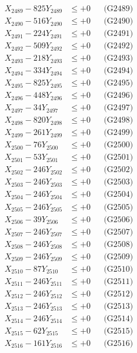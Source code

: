 \documentclass[a4paper,10pt]{article}
\begin{document}
{\begin{align}
X_{2489} - 825Y_{2489} &\leq +0 && \text{(G2489)} \\
X_{2490} - 516Y_{2490} &\leq +0 && \text{(G2490)} \\
\allowbreak
X_{2491} - 224Y_{2491} &\leq +0 && \text{(G2491)} \\
X_{2492} - 509Y_{2492} &\leq +0 && \text{(G2492)} \\
X_{2493} - 218Y_{2493} &\leq +0 && \text{(G2493)} \\
X_{2494} - 334Y_{2494} &\leq +0 && \text{(G2494)} \\
X_{2495} - 825Y_{2495} &\leq +0 && \text{(G2495)} \\
X_{2496} - 448Y_{2496} &\leq +0 && \text{(G2496)} \\
X_{2497} - 34Y_{2497} &\leq +0 && \text{(G2497)} \\
X_{2498} - 820Y_{2498} &\leq +0 && \text{(G2498)} \\
X_{2499} - 261Y_{2499} &\leq +0 && \text{(G2499)} \\
X_{2500} - 76Y_{2500} &\leq +0 && \text{(G2500)} \\
\allowbreak
X_{2501} - 53Y_{2501} &\leq +0 && \text{(G2501)} \\
X_{2502} - 246Y_{2502} &\leq +0 && \text{(G2502)} \\
X_{2503} - 246Y_{2503} &\leq +0 && \text{(G2503)} \\
X_{2504} - 246Y_{2504} &\leq +0 && \text{(G2504)} \\
X_{2505} - 246Y_{2505} &\leq +0 && \text{(G2505)} \\
X_{2506} - 39Y_{2506} &\leq +0 && \text{(G2506)} \\
X_{2507} - 246Y_{2507} &\leq +0 && \text{(G2507)} \\
X_{2508} - 246Y_{2508} &\leq +0 && \text{(G2508)} \\
X_{2509} - 246Y_{2509} &\leq +0 && \text{(G2509)} \\
X_{2510} - 87Y_{2510} &\leq +0 && \text{(G2510)} \\
\allowbreak
X_{2511} - 246Y_{2511} &\leq +0 && \text{(G2511)} \\
X_{2512} - 246Y_{2512} &\leq +0 && \text{(G2512)} \\
X_{2513} - 246Y_{2513} &\leq +0 && \text{(G2513)} \\
X_{2514} - 246Y_{2514} &\leq +0 && \text{(G2514)} \\
X_{2515} - 62Y_{2515} &\leq +0 && \text{(G2515)} \\
X_{2516} - 161Y_{2516} &\leq +0 && \text{(G2516)} \\

\end{align}}
\end{document}

